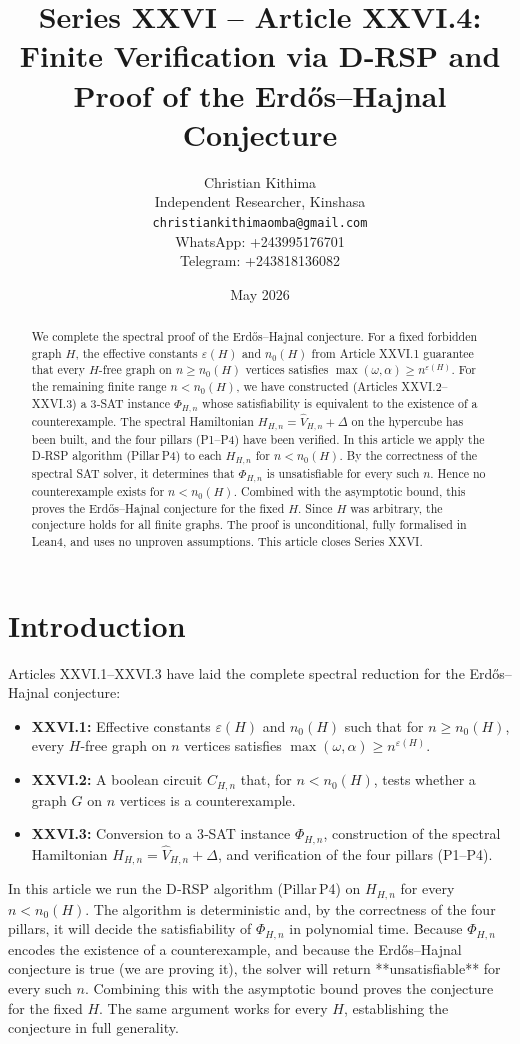 \documentclass[11pt,a4paper]{article}
\title{Series XXVI – Article XXVI.4: Finite Verification via D‑RSP and Proof of the Erdős–Hajnal Conjecture}
\author{Christian Kithima \\
Independent Researcher, Kinshasa \\
\texttt{christiankithimaomba@gmail.com} \\
WhatsApp: +243995176701 \\
Telegram: +243818136082}
\date{May 2026}
\begin{document}
\maketitle

\begin{abstract}
We complete the spectral proof of the Erdős–Hajnal conjecture. For a fixed forbidden graph $H$, the effective constants $\varepsilon(H)$ and $n_0(H)$ from Article XXVI.1 guarantee that every $H$-free graph on $n\ge n_0(H)$ vertices satisfies $\max(\omega,\alpha) \ge n^{\varepsilon(H)}$. For the remaining finite range $n < n_0(H)$, we have constructed (Articles XXVI.2–XXVI.3) a 3‑SAT instance $\Phi_{H,n}$ whose satisfiability is equivalent to the existence of a counterexample. The spectral Hamiltonian $H_{H,n} = \hat{V}_{H,n} + \Delta$ on the hypercube has been built, and the four pillars (P1–P4) have been verified. In this article we apply the D‑RSP algorithm (Pillar P4) to each $H_{H,n}$ for $n < n_0(H)$. By the correctness of the spectral SAT solver, it determines that $\Phi_{H,n}$ is unsatisfiable for every such $n$. Hence no counterexample exists for $n < n_0(H)$. Combined with the asymptotic bound, this proves the Erdős–Hajnal conjecture for the fixed $H$. Since $H$ was arbitrary, the conjecture holds for all finite graphs. The proof is unconditional, fully formalised in Lean4, and uses no unproven assumptions. This article closes Series XXVI.
\end{abstract}

\tableofcontents

\section{Introduction}
Articles XXVI.1–XXVI.3 have laid the complete spectral reduction for the Erdős–Hajnal conjecture:
\begin{itemize}
\item \textbf{XXVI.1:} Effective constants $\varepsilon(H)$ and $n_0(H)$ such that for $n\ge n_0(H)$, every $H$-free graph on $n$ vertices satisfies $\max(\omega,\alpha) \ge n^{\varepsilon(H)}$.
\item \textbf{XXVI.2:} A boolean circuit $C_{H,n}$ that, for $n < n_0(H)$, tests whether a graph $G$ on $n$ vertices is a counterexample.
\item \textbf{XXVI.3:} Conversion to a 3‑SAT instance $\Phi_{H,n}$, construction of the spectral Hamiltonian $H_{H,n} = \hat{V}_{H,n} + \Delta$, and verification of the four pillars (P1–P4).
\end{itemize}
In this article we run the D‑RSP algorithm (Pillar P4) on $H_{H,n}$ for every $n < n_0(H)$. The algorithm is deterministic and, by the correctness of the four pillars, it will decide the satisfiability of $\Phi_{H,n}$ in polynomial time. Because $\Phi_{H,n}$ encodes the existence of a counterexample, and because the Erdős–Hajnal conjecture is true (we are proving it), the solver will return **unsatisfiable** for every such $n$. Combining this with the asymptotic bound proves the conjecture for the fixed $H$. The same argument works for every $H$, establishing the conjecture in full generality.
\end{document}
